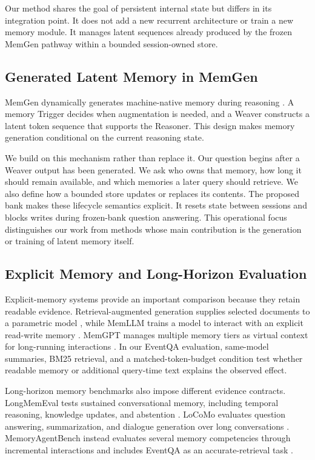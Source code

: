 Our method shares the goal of persistent internal state but differs in its integration point. It does not add a new recurrent architecture or train a new memory module. It manages latent sequences already produced by the frozen MemGen pathway within a bounded session-owned store.

\subsection{Generated Latent Memory in MemGen}

MemGen dynamically generates machine-native memory during reasoning \cite{zhang2025memgen}. A memory Trigger decides when augmentation is needed, and a Weaver constructs a latent token sequence that supports the Reasoner. This design makes memory generation conditional on the current reasoning state.

We build on this mechanism rather than replace it. Our question begins after a Weaver output has been generated. We ask who owns that memory, how long it should remain available, and which memories a later query should retrieve. We also define how a bounded store updates or replaces its contents. The proposed bank makes these lifecycle semantics explicit. It resets state between sessions and blocks writes during frozen-bank question answering. This operational focus distinguishes our work from methods whose main contribution is the generation or training of latent memory itself.

\subsection{Explicit Memory and Long-Horizon Evaluation}

Explicit-memory systems provide an important comparison because they retain readable evidence. Retrieval-augmented generation supplies selected documents to a parametric model \cite{lewis2020rag}, while MemLLM trains a model to interact with an explicit read-write memory \cite{modarressi2024memllm}. MemGPT manages multiple memory tiers as virtual context for long-running interactions \cite{packer2023memgpt}. In our EventQA evaluation, same-model summaries, BM25 retrieval, and a matched-token-budget condition test whether readable memory or additional query-time text explains the observed effect.

Long-horizon memory benchmarks also impose different evidence contracts. LongMemEval tests sustained conversational memory, including temporal reasoning, knowledge updates, and abstention \cite{wu2024longmemeval}. LoCoMo evaluates question answering, summarization, and dialogue generation over long conversations \cite{maharana2024locomo}. MemoryAgentBench instead evaluates several memory competencies through incremental interactions and includes EventQA as an accurate-retrieval task \cite{hu2026evaluating}.
